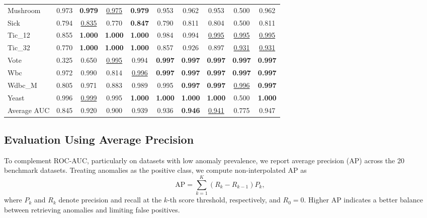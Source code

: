 \documentclass[ASNA,twocolumn]{USG} %
\begin{document}
\begin{table}[!ht]
{\begin{tabular}{lcccc|cccc|c}
            Mushroom & 0.973 & \textbf{0.979} & \underline{0.975} & \textbf{0.979} & 0.953 & 0.962 & 0.953 & 0.500 & 0.962 \\
            Sick & 0.794 & \underline{0.835} & 0.770 & \textbf{0.847} & 0.790 & 0.811 & 0.804 & 0.500 & 0.811 \\
            Tic\_12 & 0.855 & \textbf{1.000} & \textbf{1.000} & \textbf{1.000} & 0.984 & 0.994 & \underline{0.995} & \underline{0.995} & \underline{0.995} \\
            Tic\_32 & 0.770 & \textbf{1.000} & \textbf{1.000} & \textbf{1.000} & 0.857 & 0.926 & 0.897 & \underline{0.931} & \underline{0.931} \\
            Vote & 0.325 & 0.650 & \underline{0.995} & 0.994 & \textbf{0.997} & \textbf{0.997} & \textbf{0.997} & \textbf{0.997} & \textbf{0.997} \\
            Wbc & 0.972 & 0.990 & 0.814 & \underline{0.996} & \textbf{0.997} & \textbf{0.997} & \textbf{0.997} & \textbf{0.997} & \textbf{0.997} \\
            Wdbc\_M & 0.805 & 0.971 & 0.883 & 0.989 & 0.995 & \textbf{0.997} & \textbf{0.997} & \underline{0.996} & \textbf{0.997} \\
            Yeast & 0.996 & \underline{0.999} & 0.995 & \textbf{1.000} & \textbf{1.000} & \textbf{1.000} & \textbf{1.000} & 0.500 & \textbf{1.000} \\
            \midrule
            Average AUC & 0.845 & 0.920 & 0.900 & 0.939 & 0.936 & \textbf{0.946} & \underline{0.941} & 0.775 & 0.947 \\
            \bottomrule
        \end{tabular}%
    }
\end{table}



\subsection{Evaluation Using Average Precision}

To complement ROC-AUC, particularly on datasets with low anomaly prevalence, we report average precision (AP) across the 20 benchmark datasets. Treating anomalies as the positive class, we compute non-interpolated AP as
\begin{equation*}\label{AP_equ}
    \mathrm{AP}=\sum_{k=1}^{K}(R_k-R_{k-1})P_k,
\end{equation*}
where $P_k$ and $R_k$ denote precision and recall at the $k$-th score threshold, respectively, and $R_0=0$. Higher AP indicates a better balance between retrieving anomalies and limiting false positives. 
\end{document}
